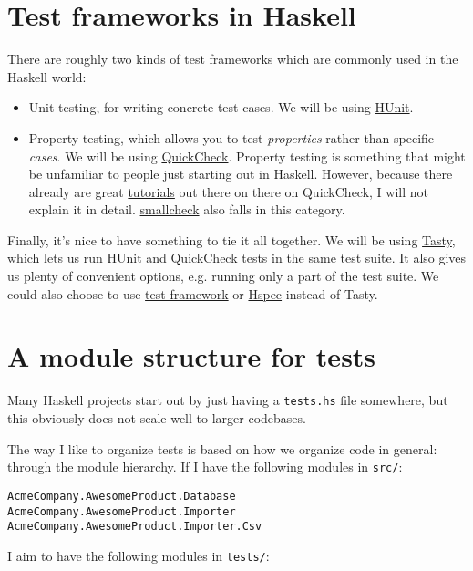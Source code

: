 \section{Test frameworks in Haskell}

There are roughly two kinds of test frameworks which are commonly used in the Haskell world:

\begin{itemize}
\item Unit testing, for writing concrete test cases. We will be using \href{http://hackage.haskell.org/package/HUnit}{HUnit}.

\item Property testing, which allows you to test \textit{properties} rather than specific \textit{cases}. We will be using \href{http://hackage.haskell.org/package/QuickCheck}{QuickCheck}. Property testing is something that might be unfamiliar to people just starting out in Haskell. However, because there already are great \href{http://wiki.haskell.org/Introduction_to_QuickCheck1}{tutorials} out there on there on QuickCheck, I will not explain it in detail. \href{http://hackage.haskell.org/package/smallcheck}{smallcheck} also falls in this category.
\end{itemize}

Finally, it's nice to have something to tie it all together. We will be using \href{http://hackage.haskell.org/package/tasty}{Tasty}, which lets us run HUnit and QuickCheck tests in the same test suite. It also gives us plenty of convenient options, e.g. running only a part of the test suite. We could also choose to use \href{http://hackage.haskell.org/package/test-framework}{test-framework} or \href{http://hspec.github.io/}{Hspec} instead of Tasty.

\section{A module structure for tests}

Many Haskell projects start out by just having a \texttt{tests.hs} file somewhere, but this obviously does not scale well to larger codebases.

The way I like to organize tests is based on how we organize code in general: through the module hierarchy. If I have the following modules in \texttt{src/}:

\begin{verbatim}
AcmeCompany.AwesomeProduct.Database
AcmeCompany.AwesomeProduct.Importer
AcmeCompany.AwesomeProduct.Importer.Csv
\end{verbatim}
I aim to have the following modules in \texttt{tests/}:

